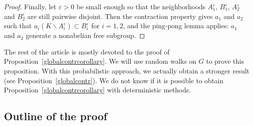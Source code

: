 \documentclass[10pt]{amsart}
\theoremstyle{definition}\newtheorem{defi}[theo]{Definition}\newtheorem{rema}[theo]{Remark}\newtheorem{exam}[theo]{Example}\newtheorem{exem}[theo]{Example}\newtheorem{nota}[theo]{Notation}
\newcommand{\ep}{\varepsilon}
\begin{document}
\begin{proof}
Finally, let $\ep>0$ be small enough so that the neighborhoods $A_1^\ep$, $B_1^\ep$, $A_2^\ep$ and $B_2^\ep$ are still pairwise disjoint. Then the contraction property gives $a_1$ and $a_2$ such that $a_i(K\backslash A_i^\ep)\subset B_i^\ep$ for $i=1,2$, and the {ping-pong lemma} applies: $a_1$ and $a_2$ generate a nonabelian free subgroup.
\end{proof}

The rest of the article is mostly devoted to the proof of Proposition~\ref{globalcontrcorollary}. We will use random walks on $G$ to prove this proposition. With this probabilistic approach, we actually obtain a stronger result (see Proposition~\ref{globalcontr}). We do not know if it is possible to obtain Proposition~\ref{globalcontrcorollary} with deterministic methods.



\subsection{Outline of the proof}
\end{document}
